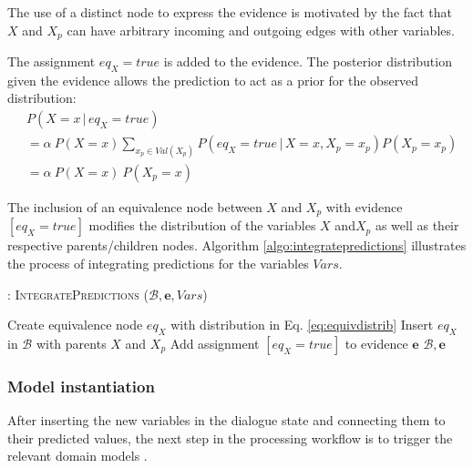 The use of a distinct node to express the evidence is motivated by the fact that $X$ and $X_p$ can have arbitrary incoming and outgoing edges with other variables. 

The assignment $eq_{X} \!=\! true$ is added to the evidence. The posterior distribution given the evidence allows the prediction to act as a prior for the observed distribution:
\begin{align}
&P(X = x \, | \, eq_{X}\!=\!true) \nonumber \\
&=  \alpha \ P(X\!=\!x)  \sum_{x_p \in Val(X_p)} P(eq_{X}\!=\!true\, |\, X\!=\!x, X_p \!=\!x_p ) P(X_p\!=\!x_p) \\
&= \alpha \ P(X\!=\!x) \ P(X_p\!=\!x) \label{eq:equivalence}
\end{align}

The inclusion of an equivalence node between $X$ and $X_p$ with evidence  $[eq_{X}\!=\!true]$ modifies the distribution of the variables $X$ and$X_p$ as well as their respective parents/children nodes.  Algorithm \ref{algo:integratepredictions} illustrates the process of integrating predictions for the variables $\mathit{Vars}$. 

\begin{algorithm}[h]
\caption{: \textsc{IntegratePredictions} ($\mathcal{B}, \mathbf{e}, \mathit{Vars}$)}
\begin{algorithmic}[1] \vspace{1mm}
\STATE Create equivalence node $eq_{X}$ with distribution in Eq. \eqref{eq:equivdistrib}
\STATE Insert $eq_{X}$ in $\mathcal{B}$ with parents $\mathit{X}$ and $\mathit{X}_p$
\STATE Add assignment $[eq_{X}\!=\!true]$ to evidence $\mathbf{e}$
\ENDIF
\ENDFOR
\RETURN $\mathcal{B}, \mathbf{e}$
\end{algorithmic}
\label{algo:integratepredictions}
\end{algorithm}



\subsubsection*{Model instantiation}

After inserting the new variables in the dialogue state and connecting them to their predicted values, the next step in the processing workflow is to trigger the relevant domain models . 

